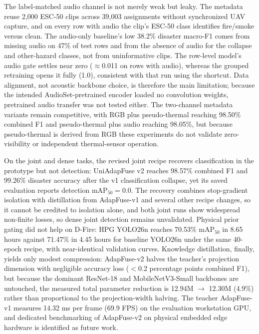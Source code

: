 \documentclass[journal]{IEEEtran}
\begin{document}
The label-matched audio channel is not merely weak but leaky. The metadata reuse 2{,}000 ESC-50 clips across 39{,}003 assignments without synchronized UAV capture, and on every row with audio the clip's ESC-50 class identifies fire/smoke versus clean. The audio-only baseline's low 38.2\% disaster macro-F1 comes from missing audio on 47\% of test rows and from the absence of audio for the collapse and other-hazard classes, not from uninformative clips. The row-level model's audio gate settles near zero ($\approx$0.011 on rows with audio), whereas the grouped retraining opens it fully (1.0), consistent with that run using the shortcut. Data alignment, not acoustic backbone choice, is therefore the main limitation; because the intended AudioSet-pretrained encoder loaded no convolution weights, pretrained audio transfer was not tested either. The two-channel metadata variants remain competitive, with RGB plus pseudo-thermal reaching 98.50\% combined F1 and pseudo-thermal plus audio reaching 98.05\%, but because pseudo-thermal is derived from RGB these experiments do not validate zero-visibility or independent thermal-sensor operation.

On the joint and dense tasks, the revised joint recipe recovers classification in the prototype but not detection: UniAdapFuse v2 reaches 98.57\% combined F1 and 99.26\% disaster accuracy after the v1 classification collapse, yet its saved evaluation reports detection $\mathrm{mAP}_{50}=0.0$. The recovery combines stop-gradient isolation with distillation from AdapFuse-v1 and several other recipe changes, so it cannot be credited to isolation alone, and both joint runs show widespread non-finite losses, so dense joint detection remains unvalidated. Physical prior gating did not help on D-Fire: HPG YOLO26n reaches 70.53\% $\mathrm{mAP}_{50}$ in 8.65 hours against 71.47\% in 4.45 hours for baseline YOLO26n under the same 40-epoch recipe, with near-identical validation curves. Knowledge distillation, finally, yields only modest compression: AdapFuse-v2 halves the teacher's projection dimension with negligible accuracy loss ($<$0.2 percentage points combined F1), but because the dominant ResNet-18 and MobileNetV3-Small backbones are untouched, the measured total parameter reduction is 12.94M $\to$ 12.30M (4.9\%) rather than proportional to the projection-width halving. The teacher AdapFuse-v1 measures 14.32 ms per frame (69.9 FPS) on the evaluation workstation GPU, and dedicated benchmarking of AdapFuse-v2 on physical embedded edge hardware is identified as future work.
\end{document}
